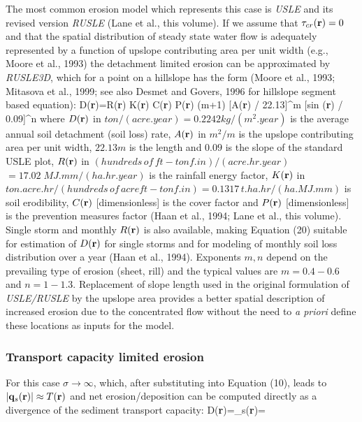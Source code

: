 \documentclass{kapedbk} %
\begin{document}
The most common erosion model which represents this case is
{\sl USLE} and its revised version {\sl RUSLE} (Lane et al., this volume).
If we assume that $\tau_{cr}({\bf r})=0$
and that the spatial distribution of steady state water flow 
is adequately represented by a function of
upslope contributing area per unit width (e.g., Moore et al., 1993) 
the detachment limited erosion can be approximated by
{\sl RUSLE3D}, which for a point on a hillslope
has the form (Moore et al., 1993; Mitasova et al., 1999; 
see also Desmet and Govers, 1996 for hillslope segment based equation):
\smallskip
\leftequation
D({\bf r})=R({\bf r}) K({\bf r}) C({\bf r}) P({\bf r})
(m+1) [A({\bf r}) / 22.13]^m [sin \beta({\bf r}) / 0.09]^n
\endleftequation
\smallskip
\noindent
where
$D({\bf r})$ in $ton/(acre.year)=0.2242kg/(m^2.year)$ 
 is the average annual soil detachment (soil loss) rate,
$A({\bf r})$ in $m^2/m$ is the upslope contributing area per unit width,
$22.13m$ is the length and $0.09$ is the slope of the standard
USLE plot, $R({\bf r})$ in $(hundreds\,of\,ft-tonf.in)/(acre.hr.year)$
$=17.02 \; MJ.mm/(ha.hr.year)$ is the rainfall energy factor, 
$K({\bf r})$ in
$ton.acre.hr/$$(hundreds\,of\,acre ft-tonf.in)=0.1317\,
t.ha.hr/$$(ha.MJ.mm)$ is
soil erodibility, $C({\bf r})$ [dimensionless] is the cover factor and
$P({\bf r})$ [dimensionless] is the prevention measures factor 
(Haan et al., 1994; Lane et al., this volume). Single storm and
monthly $R({\bf r})$ is also available, making Equation (20) suitable for
estimation of $D({\bf r})$ for single storms and for modeling of
monthly soil loss distribution over a year (Haan et al., 1994). 
Exponents $m,n$ depend on the prevailing type of
erosion (sheet, rill) and the typical values are $m=0.4-0.6$ and $n=1-1.3$.
Replacement of slope length used in the original formulation of 
{\sl USLE/RUSLE} by the upslope area provides a better spatial description
of increased erosion due to the concentrated flow without the need
to {\sl a priori} define these locations as inputs for the model.

\medskip
\noindent
\subsubsection {Transport capacity limited erosion} 

\quad

\medskip
For this case $\sigma \to \infty$,
which, after substituting into Equation (10), leads to 
$|{\bf q}_s({\bf r})| \approx T({\bf r})$ and
net erosion/deposition can be computed directly as a divergence of
the sediment transport capacity:
\leftequation
D({\bf r})=\nabla{}_s({\bf r})=
\nabla\cdot \bigl[T({\bf r}){\bf s_0}({\bf r})\bigr]
\endleftequation
\end{document}
